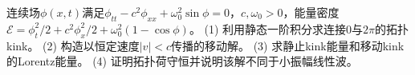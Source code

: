 连续场\(\phi(x,t)\)满足\(\phi_{tt}-c^2\phi_{xx}+\omega_0^2\sin\phi=0\)，\(c,\omega_0>0\)，能量密度\(\mathcal E=\phi_t^2/2+c^2\phi_x^2/2+\omega_0^2(1-\cos\phi)\)。
(1) 利用静态一阶积分求连接0与\(2\pi\)的拓扑kink。
(2) 构造以恒定速度\(|v|<c\)传播的移动解。
(3) 求静止kink能量和移动kink的Lorentz能量。
(4) 证明拓扑荷守恒并说明该解不同于小振幅线性波。
